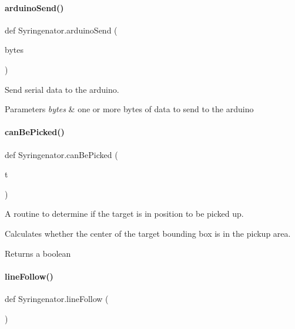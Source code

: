 \paragraph{\texorpdfstring{arduinoSend()}{arduinoSend()}}
{\footnotesize\ttfamily def Syringenator.\+arduino\+Send (\begin{DoxyParamCaption}\item[{}]{bytes }\end{DoxyParamCaption})}



Send serial data to the arduino. 


\begin{DoxyParams}{Parameters}
{\em bytes} & one or more bytes of data to send to the arduino \\
\hline
\end{DoxyParams}
\mbox{\label{namespaceSyringenator_acb08d40f080a03cb4e7a43ee3ab4854b}} 
\paragraph{\texorpdfstring{canBePicked()}{canBePicked()}}
{\footnotesize\ttfamily def Syringenator.\+can\+Be\+Picked (\begin{DoxyParamCaption}\item[{}]{t }\end{DoxyParamCaption})}



A routine to determine if the target is in position to be picked up. 

Calculates whether the center of the target bounding box is in the pickup area.

\begin{DoxyReturn}{Returns}
a boolean 
\end{DoxyReturn}
\mbox{\label{namespaceSyringenator_a824ef6e71bc0975483435ffbdd58cb3e}} 
\paragraph{\texorpdfstring{lineFollow()}{lineFollow()}}
{\footnotesize\ttfamily def Syringenator.\+line\+Follow (\begin{DoxyParamCaption}{ }\end{DoxyParamCaption})}



